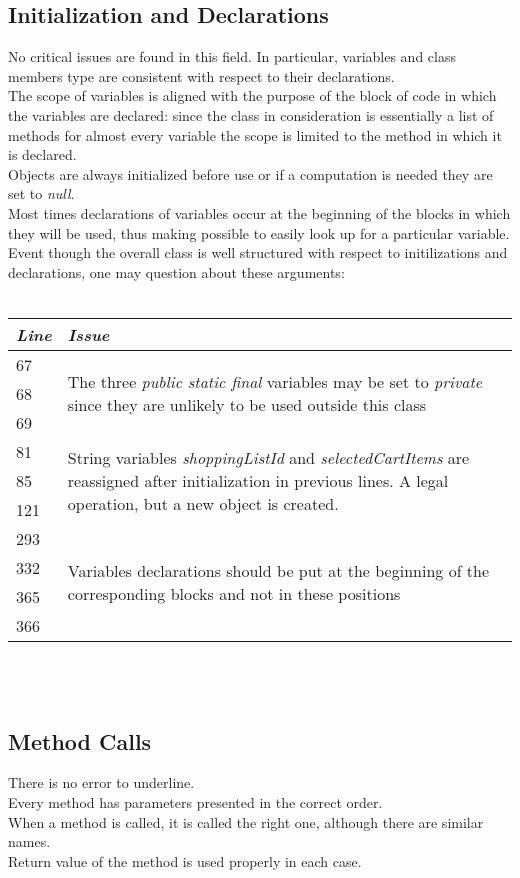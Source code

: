 \documentclass[11pt,a4paper]{report}
\begin{document}
\subsection{Initialization and Declarations}
No critical issues are found in this field. In particular, variables and class members type are consistent with respect to their declarations.\\The scope of variables is aligned with the purpose of the block of code in which the variables are declared: since the class in consideration is essentially a list of methods for almost every variable the scope is limited to the method in which it is declared.\\Objects are always initialized before use or if a computation is needed they are set to \textit{null}.\\Most times declarations of variables occur at the beginning of the blocks in which they will be used, thus making possible to easily look up for a particular variable.\\
Event though the overall class is well structured with respect to initilizations and declarations, one may question about these arguments:
\\\\
\begin{tabularx}{\textwidth}{|l|X|}
	\hline
	\textit{Line} & \textit{Issue}\\
	\hline
	67 & \multirow{3}{*}{The three \textit{public static final} variables may be set to \textit{private} since they are unlikely to be used outside this class}\\
	68 & \\
	69 & \\
	\hline
	\hline
	81 & \multirow{3}{*}{String variables \textit{shoppingListId} and \textit{selectedCartItems} are reassigned after initialization in previous lines. A legal operation, but a new object is created.}\\
	85 & \\
	121 & \\
	\hline
	\hline
	293 & \multirow{4}{*}{Variables declarations should be put at the beginning of the corresponding blocks and not in these positions}\\
	332 & \\
	365 & \\
	366 & \\
	\hline
\end{tabularx}
\\\\
\subsection{Method Calls}
There is no error to underline.\\Every method has parameters presented in the correct order.\\When a method is called, it is called the right one, although there are similar names.\\Return value of the method is used properly in each case. 
\end{document}
